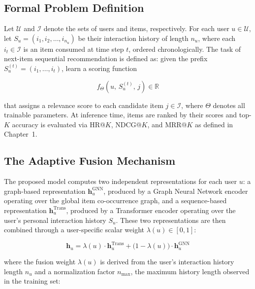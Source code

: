 \documentclass[12pt,a4paper]{report}
\begin{document}
\subsection{Formal Problem Definition}

Let \(\mathcal{U}\) and \(\mathcal{I}\) denote the sets of users and items,
respectively. For each user \(u \in \mathcal{U}\), let
\(S_u = (i_1, i_2, \ldots, i_{n_u})\) be their interaction history of length
\(n_u\), where each \(i_t \in \mathcal{I}\) is an item consumed at time step
\(t\), ordered chronologically. The task of next-item sequential recommendation
is defined as: given the prefix \(S_u^{(t)} = (i_1, \ldots, i_t)\), learn a
scoring function

\begin{equation}
    f_{\Theta}\!\left(u,\, S_u^{(t)},\, j\right) \in \mathbb{R}
    \label{eq:scoring}
\end{equation}

\noindent that assigns a relevance score to each candidate item
\(j \in \mathcal{I}\), where \(\Theta\) denotes all trainable parameters. At
inference time, items are ranked by their scores and top-\(K\) accuracy is
evaluated via HR@\(K\), NDCG@\(K\), and MRR@\(K\) as defined in
Chapter~1.

\subsection{The Adaptive Fusion Mechanism}

The proposed model computes two independent representations for each user
\(u\): a graph-based representation \(\mathbf{h}_u^{\text{GNN}}\), produced by
a Graph Neural Network encoder operating over the global item co-occurrence
graph, and a sequence-based representation \(\mathbf{h}_u^{\text{Trans}}\),
produced by a Transformer encoder operating over the user's personal
interaction history \(S_u\). These two representations are then combined
through a user-specific scalar weight \(\lambda(u) \in [0, 1]\):

\begin{equation}
    \mathbf{h}_u = \lambda(u)\cdot \mathbf{h}_u^{\text{Trans}}
    + \bigl(1 - \lambda(u)\bigr)\cdot \mathbf{h}_u^{\text{GNN}}
    \label{eq:fusion}
\end{equation}

\noindent where the fusion weight \(\lambda(u)\) is derived from the user's
interaction history length \(n_u\) and a normalization factor \(n_{\max}\),
the maximum history length observed in the training set:
\end{document}
